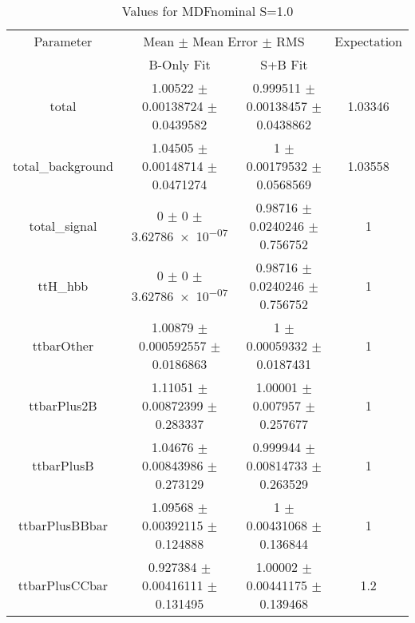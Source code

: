 \begin{table}
\centering
\caption{Values for MDFnominal S=1.0}
\begin{tabular}{cccc}
\toprule
Parameter & \multicolumn{2}{c}{Mean $\pm$ Mean Error $\pm$ RMS} & Expectation\\
 & B-Only Fit & S+B Fit & \\
\midrule
total & \num{1.00522} $\pm$ \num{0.00138724} $\pm$ \num{0.0439582} & \num{0.999511} $\pm$ \num{0.00138457} $\pm$ \num{0.0438862} & \num{1.03346}\\
total\_background & \num{1.04505} $\pm$ \num{0.00148714} $\pm$ \num{0.0471274} & \num{1} $\pm$ \num{0.00179532} $\pm$ \num{0.0568569} & \num{1.03558}\\
total\_signal & \num{0} $\pm$ \num{0} $\pm$ \num{3.62786e-07} & \num{0.98716} $\pm$ \num{0.0240246} $\pm$ \num{0.756752} & \num{1}\\
ttH\_hbb & \num{0} $\pm$ \num{0} $\pm$ \num{3.62786e-07} & \num{0.98716} $\pm$ \num{0.0240246} $\pm$ \num{0.756752} & \num{1}\\
ttbarOther & \num{1.00879} $\pm$ \num{0.000592557} $\pm$ \num{0.0186863} & \num{1} $\pm$ \num{0.00059332} $\pm$ \num{0.0187431} & \num{1}\\
ttbarPlus2B & \num{1.11051} $\pm$ \num{0.00872399} $\pm$ \num{0.283337} & \num{1.00001} $\pm$ \num{0.007957} $\pm$ \num{0.257677} & \num{1}\\
ttbarPlusB & \num{1.04676} $\pm$ \num{0.00843986} $\pm$ \num{0.273129} & \num{0.999944} $\pm$ \num{0.00814733} $\pm$ \num{0.263529} & \num{1}\\
ttbarPlusBBbar & \num{1.09568} $\pm$ \num{0.00392115} $\pm$ \num{0.124888} & \num{1} $\pm$ \num{0.00431068} $\pm$ \num{0.136844} & \num{1}\\
ttbarPlusCCbar & \num{0.927384} $\pm$ \num{0.00416111} $\pm$ \num{0.131495} & \num{1.00002} $\pm$ \num{0.00441175} $\pm$ \num{0.139468} & \num{1.2}\\
\bottomrule
\end{tabular}
\end{table}